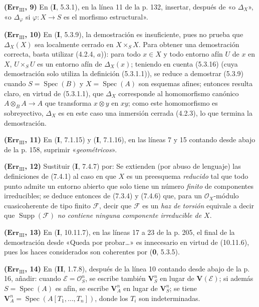 \documentclass[10pt,oneside]{book}
\begin{document}
\noindent\textbf{($\mathbf{Err}_{\mathrm{III}}$, 9)} En (\textbf I, 5.3.1), en la
línea 11 de la p. 132, insertar, después de «o $\Delta_X$», «o $\Delta_\varphi$
si $\varphi:X\to S$ es el morfismo estructural».

\noindent\textbf{($\mathbf{Err}_{\mathrm{III}}$, 10)} En (\textbf I, 5.3.9), la
demostración es insuficiente, pues no prueba que $\Delta_X(X)$ sea localmente
cerrado en $X\times_SX$. Para obtener una demostración correcta, basta utilizar
(4.2.4, $a$)): para todo $x\in X$ y todo entorno afín $U$ de $x$ en $X$,
$U\times_SU$ es un entorno afín de $\Delta_X(x)$; teniendo en cuenta (5.3.16)
(cuya demostración solo utiliza la definición (5.3.1.1)), se reduce a demostrar
(5.3.9) cuando $S=\operatorname{Spec}(B)$ y $X=\operatorname{Spec}(A)$ son
esquemas afines; entonces resulta claro, en virtud de (5.3.1.1), que $\Delta_X$
corresponde al homomorfismo canónico $A\otimes_BA\to A$ que transforma
$x\otimes y$ en $xy$; como este homomorfismo es sobreyectivo, $\Delta_X$ es en
este caso una inmersión cerrada (4.2.3), lo que termina la demostración.

\noindent\textbf{($\mathbf{Err}_{\mathrm{III}}$, 11)} En (\textbf I, 7.1.15) y
(\textbf I, 7.1.16), en las líneas 7 y 15 contando desde abajo de la p. 158, suprimir
«\emph{geométricos}».

\noindent\textbf{($\mathbf{Err}_{\mathrm{III}}$, 12)} Sustituir (\textbf I, 7.4.7)
por: Se extienden (por abuso de lenguaje) las definiciones de (7.4.1) al caso
en que $X$ es un preesquema \emph{reducido} tal que todo punto admite un
entorno abierto que solo tiene un número \emph{finito} de componentes
irreducibles; se deduce entonces de (7.3.4) y (7.4.6) que, para un
$\mathscr O_X$-módulo cuasicoherente de tipo finito $\mathscr F$, decir que
$\mathscr F$ es un \emph{haz de torsión} equivale a decir que
$\operatorname{Supp}(\mathscr F)$ \emph{no contiene ninguna componente
irreducible de $X$}.

\noindent\textbf{($\mathbf{Err}_{\mathrm{III}}$, 13)} En (\textbf I, 10.11.7), en
las líneas 17 a 23 de la p. 205, el final de la demostración desde «Queda por
probar\ldots{}» es innecesario en virtud de (10.11.6), pues los haces
considerados son coherentes por (\textbf{0}, 5.3.5).

\noindent\textbf{($\mathbf{Err}_{\mathrm{III}}$, 14)} En (\textbf{II}, 1.7.8),
después de la línea 10 contando desde abajo de la p. 16, añadir: cuando
$\mathscr E=\mathscr O_S^n$, se escribe también $\mathbf V_S^n$ en lugar de
$\mathbf V(\mathscr E)$; si además $S=\operatorname{Spec}(A)$ es afín, se
escribe $\mathbf V_A^n$ en lugar de $\mathbf V_S^n$; se tiene
$\mathbf V_A^n=\operatorname{Spec}(A[T_1,\ldots,T_n])$, donde los $T_i$ son
indeterminadas.
\end{document}
